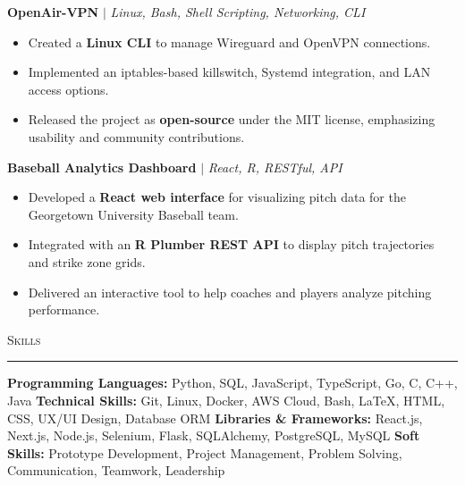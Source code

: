\documentclass[11pt,letterpaper]{article}
\begin{document}
\begin{list}{}{\setlength{\leftmargin}{1em}\setlength{\rightmargin}{2pt}}
    \item
        \small{\textbf{OpenAir-VPN}} $|$ \small{\textit{Linux, Bash, Shell Scripting, Networking, CLI}} \hfill \small{\textit{}}
          \begin{itemize}[itemsep=-5pt, topsep=-2pt]
              \item Created a \textbf{Linux CLI} to manage Wireguard and OpenVPN connections.
              \item Implemented an iptables-based killswitch, Systemd integration, and LAN access options.
              \item Released the project as \textbf{open-source} under the MIT license, emphasizing usability and community contributions.
          \end{itemize}
          \vspace{4pt}
    
    \item
          \textbf{Baseball Analytics Dashboard} $|$ \small{\textit{React, R, RESTful, API}} \hfill \small{\textit{}}
          \begin{itemize}[itemsep=-5pt, topsep=-2pt]
              \item Developed a \textbf{React web interface} for visualizing pitch data for the Georgetown University Baseball team.
              \item Integrated with an \textbf{R Plumber REST API} to display pitch trajectories and strike zone grids.
              \item Delivered an interactive tool to help coaches and players analyze pitching performance.
          \end{itemize}
\end{list}



\vspace{4pt}
\textsc{\large{Skills}} 
\vspace{4pt}
\hrule
\begin{list}{}{\setlength{\leftmargin}{1em}\setlength{\rightmargin}{2pt}}
  
    \item
          \small{\textbf{Programming Languages:} Python, SQL, JavaScript, TypeScript, Go, C, C++, Java}
          \vspace{2pt} \newline
          \small{\textbf{Technical Skills:} Git, Linux, Docker, AWS Cloud, Bash, LaTeX, HTML, CSS, UX/UI Design, Database ORM}
          \vspace{2pt} \newline
          \small{\textbf{Libraries \& Frameworks:} React.js, Next.js, Node.js, Selenium, Flask, SQLAlchemy, PostgreSQL, MySQL}
          \vspace{2pt} \newline
          \small{\textbf{Soft Skills:} Prototype Development, Project Management, Problem Solving, Communication, Teamwork, Leadership}
          \vspace{0pt}
\end{list}
\end{document}
